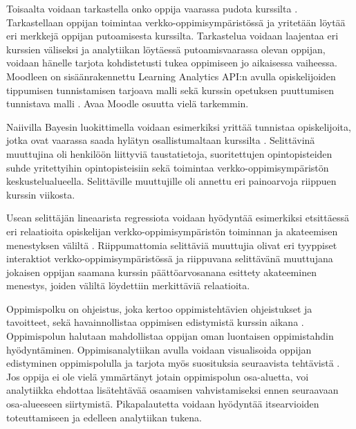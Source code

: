 Toisaalta voidaan tarkastella onko oppija vaarassa pudota kurssilta \citep{oliveSupervisedLearningFramework2018, suhonenUsingMoodleData2019}. Tarkastellaan oppijan toimintaa verkko-oppimisympäristössä ja yritetään löytää eri merkkejä oppijan putoamisesta kurssilta. Tarkastelua voidaan laajentaa eri kurssien väliseksi \citep{kinnari-korpelaOppimisanalytiikallaTehokkaampaanOhjaukseen2020} ja analytiikan löytäessä putoamisvaarassa olevan oppijan, voidaan hänelle tarjota kohdistetusti tukea oppimiseen jo aikaisessa vaiheessa. Moodleen on sisäänrakennettu Learning Analytics API:n avulla opiskelijoiden tippumisen tunnistamisen tarjoava malli sekä kurssin opetuksen puuttumisen tunnistava malli \citep{oliveSupervisedLearningFramework2018,monllaoAnalyticsAPIMoodleDocs2021}. \color{red} Avaa Moodle osuutta vielä tarkemmin. \color{black}

Naiivilla Bayesin luokittimella voidaan esimerkiksi yrittää tunnistaa opiskelijoita, jotka ovat vaarassa saada hylätyn osallistumaltaan kurssilta \citep{barberCourseCorrectionUsing2012}. Selittävinä muuttujina oli henkilöön liittyviä taustatietoja, suoritettujen opintopisteiden suhde yritettyihin opintopisteisiin sekä toimintaa verkko-oppimisympäristön keskustelualueella. Selittäville muuttujille oli annettu eri painoarvoja riippuen kurssin viikosta.

Usean selittäjän lineaarista regressiota voidaan hyödyntää esimerkiksi etsittäessä eri relaatioita opiskelijan verkko-oppimisympäristön toiminnan ja akateemisen menestyksen väliltä \citep{agudo-peregrinaCanWePredict2014}. Riippumattomia selittäviä muuttujia olivat eri tyyppiset interaktiot verkko-oppimisympäristössä ja riippuvana selittävänä muuttujana jokaisen oppijan saamana kurssin päättöarvosanana esittety akateeminen menestys, joiden väliltä löydettiin merkittäviä relaatioita.

Oppimispolku on ohjeistus, joka kertoo oppimistehtävien ohjeistukset ja tavoitteet, sekä havainnollistaa oppimisen edistymistä kurssin aikana \citep{toivolaFlippedLearningKaanteinen2017}. Oppimispolun halutaan mahdollistaa oppijan oman luontaisen oppimistahdin hyödyntäminen. Oppimisanalytiikan avulla voidaan visualisoida oppijan edistyminen oppimispolulla ja tarjota myös suosituksia seuraavista tehtävistä \citep{longPenetratingFogAnalytics2011}. Jos oppija ei ole vielä ymmärtänyt jotain oppimispolun osa-aluetta, voi analytiikka ehdottaa lisätehtävää osaamisen vahvistamiseksi ennen seuraavaan osa-alueeseen siirtymistä. Pikapalautetta voidaan hyödyntää itsearvioiden toteuttamiseen ja edelleen analytiikan tukena.

